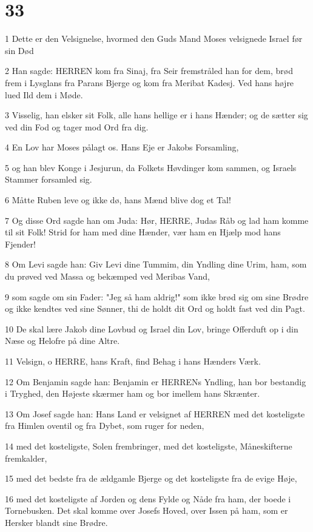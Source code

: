 \chapter{33}

\par 1 Dette er den Velsignelse, hvormed den Guds Mand Moses velsignede Israel før sin Død
\par 2 Han sagde: HERREN kom fra Sinaj, fra Seir fremstråled han for dem, brød frem i Lysglans fra Parans Bjerge og kom fra Meribat Kadesj. Ved hans højre lued Ild dem i Møde.
\par 3 Visselig, han elsker sit Folk, alle hans hellige er i hans Hænder; og de sætter sig ved din Fod og tager mod Ord fra dig.
\par 4 En Lov har Moses pålagt os. Hans Eje er Jakobs Forsamling,
\par 5 og han blev Konge i Jesjurun, da Folkets Høvdinger kom sammen, og Israels Stammer forsamled sig.
\par 6 Måtte Ruben leve og ikke dø, hans Mænd blive dog et Tal!
\par 7 Og disse Ord sagde han om Juda: Hør, HERRE, Judas Råb og lad ham komme til sit Folk! Strid for ham med dine Hænder, vær ham en Hjælp mod hans Fjender!
\par 8 Om Levi sagde han: Giv Levi dine Tummim, din Yndling dine Urim, ham, som du prøved ved Massa og bekæmped ved Meribas Vand,
\par 9 som sagde om sin Fader: "Jeg så ham aldrig!" som ikke brød sig om sine Brødre og ikke kendtes ved sine Sønner, thi de holdt dit Ord og holdt fast ved din Pagt.
\par 10 De skal lære Jakob dine Lovbud og Israel din Lov, bringe Offerduft op i din Næse og Helofre på dine Altre.
\par 11 Velsign, o HERRE, hans Kraft, find Behag i hans Hænders Værk.
\par 12 Om Benjamin sagde han: Benjamin er HERRENs Yndling, han bor bestandig i Tryghed, den Højeste skærmer ham og bor imellem hans Skrænter.
\par 13 Om Josef sagde han: Hans Land er velsignet af HERREN med det kosteligste fra Himlen oventil og fra Dybet, som ruger for neden,
\par 14 med det kosteligste, Solen frembringer, med det kosteligste, Måneskifterne fremkalder,
\par 15 med det bedste fra de ældgamle Bjerge og det kosteligste fra de evige Høje,
\par 16 med det kosteligste af Jorden og dens Fylde og Nåde fra ham, der boede i Tornebusken. Det skal komme over Josefs Hoved, over Issen på ham, som er Hersker blandt sine Brødre.
